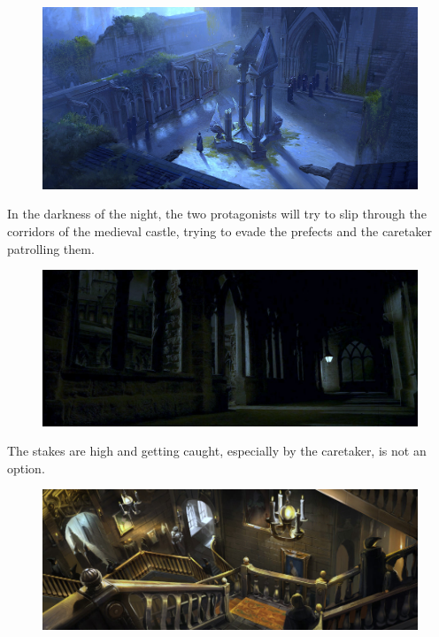 \begin{figure}[H]
\includegraphics[max width=\textwidth]{../Pictures/Level/World/Hogwarts_courtyard_picture.jpg} 
\end{figure}

In the darkness of the night, the two protagonists will try to slip through the corridors of the medieval castle, trying to evade the prefects and the caretaker patrolling them.

\begin{figure}[H]
\includegraphics[max width=\textwidth]{../Pictures/Level/World/Night_corridor_picture.jpg} 
\end{figure}

The stakes are high and getting caught, especially by the caretaker, is not an option. 

\begin{figure}[H]
\includegraphics[max width=\textwidth]{../Pictures/Level/World/Hogwarts_staircase_picture.jpg} 
\end{figure}

\pagebreak